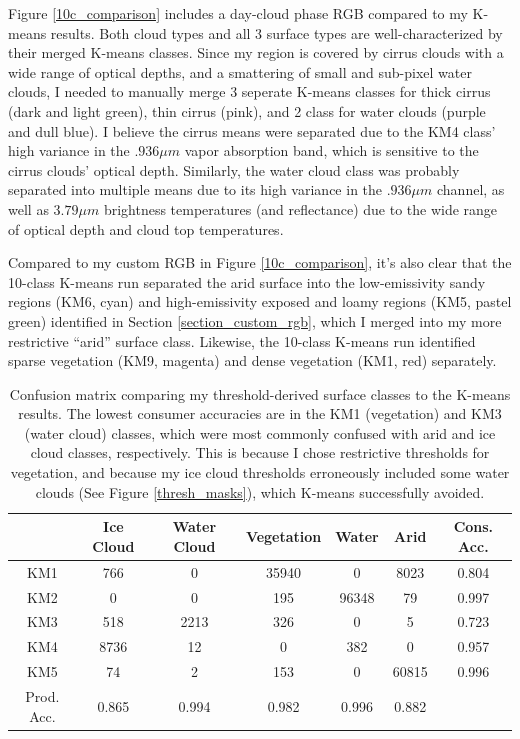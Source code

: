 \documentclass[12pt]{article}
\begin{document}
Figure \ref{10c_comparison} includes a day-cloud phase RGB compared to my K-means results. Both cloud types and all 3 surface types are well-characterized by their merged K-means classes. Since my region is covered by cirrus clouds with a wide range of optical depths, and a smattering of small and sub-pixel water clouds, I needed to manually merge 3 seperate K-means classes for thick cirrus (dark and light green), thin cirrus (pink), and 2 class for water clouds (purple and dull blue). I believe the cirrus means were separated due to the KM4 class' high variance in the $.936\mu m$ vapor absorption band, which is sensitive to the cirrus clouds' optical depth. Similarly, the water cloud class was probably separated into multiple means due to its high variance in the $.936\mu m$ channel, as well as $3.79\mu m$ brightness temperatures (and reflectance) due to the wide range of optical depth and cloud top temperatures.

Compared to my custom RGB in Figure \ref{10c_comparison}, it's also clear that the 10-class K-means run separated the arid surface into the low-emissivity sandy regions (KM6, cyan) and high-emissivity exposed and loamy regions (KM5, pastel green) identified in Section \ref{section_custom_rgb}, which I merged into my more restrictive ``arid'' surface class. Likewise, the 10-class K-means run identified sparse vegetation (KM9, magenta) and dense vegetation (KM1, red) separately.

\begin{table}[h!]
\centering
\begin{tabular}{C|CCCCC|C}
& \textnormal{Ice Cloud} & \textnormal{Water Cloud} & \textnormal{Vegetation} & \textnormal{Water} & \textnormal{Arid} & \textnormal{Cons. Acc.} \\
\hline
\textnormal{KM1} & 766 & 0 & 35940 & 0 & 8023 & 0.804 \\
\textnormal{KM2} & 0 & 0 & 195 & 96348 & 79 & 0.997 \\
\textnormal{KM3} & 518 & 2213 & 326 & 0 & 5 & 0.723 \\
\textnormal{KM4} & 8736 & 12 & 0 & 382 & 0 & 0.957 \\
\textnormal{KM5} & 74 & 2 & 153 & 0 & 60815 & 0.996 \\

\hline
\textnormal{Prod. Acc.} & 0.865 & 0.994 & 0.982 & 0.996 & 0.882\\
\end{tabular}
    \caption{Confusion matrix comparing my threshold-derived surface classes to the K-means results. The lowest consumer accuracies are in the KM1 (vegetation) and KM3 (water cloud) classes, which were most commonly confused with arid and ice cloud classes, respectively. This is because I chose restrictive thresholds for vegetation, and because my ice cloud thresholds erroneously included some water clouds (See Figure \ref{thresh_masks}), which K-means successfully avoided.}
\label{confusion_km-thresh}
\end{table}
\end{document}

